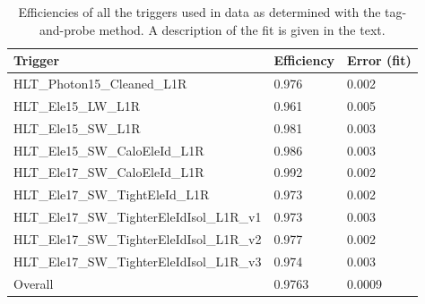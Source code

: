 



\begin{table}[htbp]
  \begin{center}
    \caption[\fixspacing Efficiencies of trigger paths used in data]
    {\fixspacing Efficiencies of all the triggers used in data 
    as determined with the tag-and-probe method. 
    A description of the fit is given in the text.}
    \label{TableTriggerEfficiencies}
    \begin{tabular}[]{ | l | l | l | }
      \hline
      Trigger	& Efficiency & Error (fit) \\ \hline \hline
      HLT\_Photon15\_Cleaned\_L1R & 0.976 & 0.002 \\ \hline
      HLT\_Ele15\_LW\_L1R & 0.961 & 0.005 \\ \hline
      HLT\_Ele15\_SW\_L1R & 0.981 & 0.003 \\ \hline
      HLT\_Ele15\_SW\_CaloEleId\_L1R & 0.986 & 0.003 \\ \hline
      HLT\_Ele17\_SW\_CaloEleId\_L1R & 0.992 & 0.002 \\ \hline
      HLT\_Ele17\_SW\_TightEleId\_L1R & 0.973 & 0.002 \\ \hline
      HLT\_Ele17\_SW\_TighterEleIdIsol\_L1R\_v1 & 0.973 & 0.003 \\ \hline
      HLT\_Ele17\_SW\_TighterEleIdIsol\_L1R\_v2 & 0.977 & 0.002 \\ \hline
      HLT\_Ele17\_SW\_TighterEleIdIsol\_L1R\_v3 & 0.974 & 0.003 \\ \hline
      Overall & 0.9763 & 0.0009 \\ \hline
    \end{tabular}
  \end{center}
\end{table}

\clearpage
